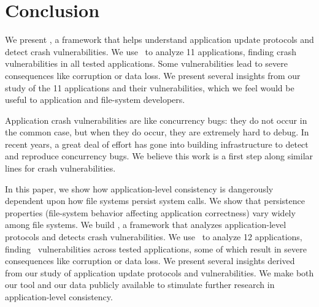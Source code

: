 \section{Conclusion}
\label{sec-conclude}

We present \toolname, a framework that helps understand application update
protocols and detect crash vulnerabilities. We use \toolname\ to analyze 11
applications, finding crash vulnerabilities in all tested applications. Some
vulnerabilities lead to severe consequences like corruption or data loss. We
present several insights from our study of the 11 applications and their
vulnerabilities, which we feel would be useful to application and file-system
developers.   

Application crash vulnerabilities are like concurrency bugs: they do not occur
in the common case, but when they do occur, they are extremely hard to debug.
In recent years, a great deal of effort has gone into building infrastructure
to detect and reproduce concurrency bugs. We believe this work is a first step
along similar lines for crash vulnerabilities.   
\fi


In this paper, we show how application-level consistency is dangerously
dependent upon how file systems persist system calls. We show that persistence
properties (file-system behavior affecting application correctness) vary widely
among file systems. We build \toolname, a framework that analyzes
application-level protocols and detects crash vulnerabilities. We use
\toolname\ to analyze 12 applications, finding \totbugs\ vulnerabilities across tested
applications, some of which result in severe consequences like corruption or data
loss. We present several insights derived from our study of application update
protocols and vulnerabilities. We make both our tool and our data publicly
available to stimulate further research in application-level consistency.

